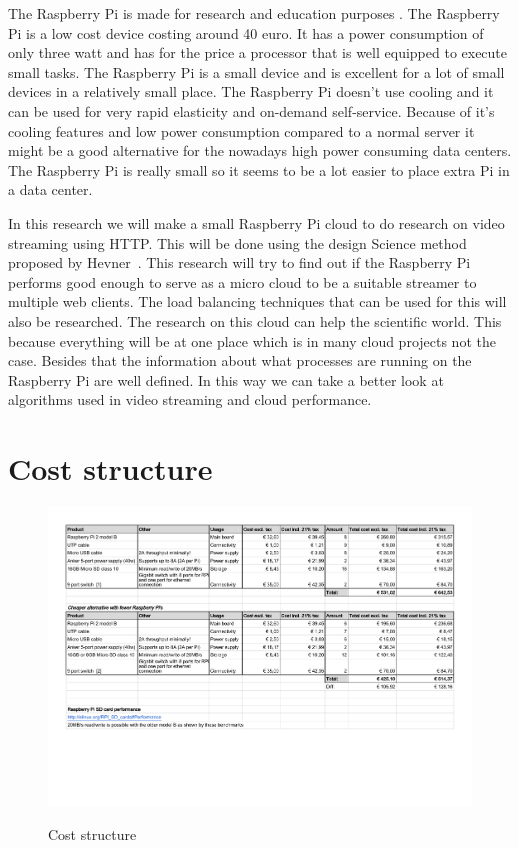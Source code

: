 \documentclass{sig-alternate-br}
\begin{document}
The Raspberry Pi is made for research and education purposes \cite{raspberry-pi}. The Raspberry Pi is a low cost device costing around 40 euro. It has a power consumption of only three watt and has for the price a processor that is well equipped to execute small tasks.  The Raspberry Pi is a small device and is excellent for a lot of small devices in a relatively small place. The Raspberry Pi doesn't use cooling and it can be used for very rapid elasticity and on-demand self-service. Because of it's cooling features and low power consumption compared to a normal server it might be a good alternative for the nowadays high power consuming data centers. The Raspberry Pi is really small so it seems to be a lot easier to place extra Pi in a data center. 

In this research we will make a small Raspberry Pi cloud to do research on video streaming using HTTP. This will be done using the design Science method proposed by Hevner~\cite{hevner:2007}. This research will try to find out if the Raspberry Pi performs good enough to serve as a micro cloud to be a suitable streamer to multiple web clients. The load balancing techniques that can be used for this will also be researched. The research on this cloud can help the scientific world. This because everything will be at one place which is in many cloud projects not the case. Besides that the information about what processes are running on the Raspberry Pi are well defined. In this way we can take a better look at algorithms used in video streaming and cloud performance. 


%
%
\vspace{50 mm}
\newpage
\appendix
\section{Cost structure}
\begin{figure}[H]
\includegraphics[scale=0.65]{Kostenoverzicht_cluster.pdf}
\label{fig:cost}
\caption{Cost structure}
\end{figure}
\end{document}

